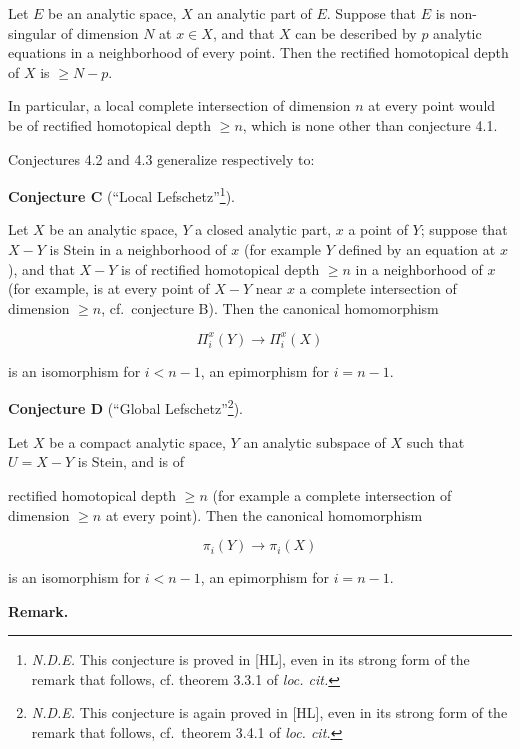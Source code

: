 \documentclass[
]{article}
\begin{document}
Let \(E\) be an analytic space, \(X\) an analytic part of \(E\). Suppose
that \(E\) is non-singular of dimension \(N\) at \(x \in X\), and that
\(X\) can be described by \(p\) analytic equations in a neighborhood of
every point. Then the rectified homotopical depth of \(X\) is
\(\geqslant N - p\).

In particular, a local complete intersection of dimension \(n\) at every
point would be of rectified homotopical depth \(\geqslant n\), which is
none other than conjecture 4.1.

Conjectures 4.2 and 4.3 generalize respectively to:

\textbf{Conjecture C} (``Local Lefschetz''\footnote{\emph{N.D.E.} This
  conjecture is proved in {[}HL{]}, even in its strong form of the
  remark that follows, cf. theorem 3.3.1 of \emph{loc. cit.}}).

Let \(X\) be an analytic space, \(Y\) a closed analytic part, \(x\) a
point of \(Y\); suppose that \(X - Y\) is Stein in a neighborhood of
\(x\) (for example \(Y\) defined by an equation at \(x\)), and that
\(X - Y\) is of rectified homotopical depth \(\geqslant n\) in a
neighborhood of \(x\) (for example, is at every point of \(X - Y\) near
\(x\) a complete intersection of dimension \(\geqslant n\),
cf.~conjecture B). Then the canonical homomorphism

\[
\Pi^{x}_{i}(Y) \to \Pi^{x}_{i}(X)
\]

is an isomorphism for \(i < n - 1\), an epimorphism for \(i = n - 1\).

\textbf{Conjecture D} (``Global Lefschetz''\footnote{\emph{N.D.E.} This
  conjecture is again proved in {[}HL{]}, even in its strong form of the
  remark that follows, cf.~theorem 3.4.1 of \emph{loc. cit.}}).

Let \(X\) be a compact analytic space, \(Y\) an analytic subspace of
\(X\) such that \(U = X - Y\) is Stein, and is of

rectified homotopical depth \(\geqslant n\) (for example a complete
intersection of dimension \(\geqslant n\) at every point). Then the
canonical homomorphism

\[
\pi_{i}(Y) \to \pi_{i}(X)
\]

is an isomorphism for \(i < n - 1\), an epimorphism for \(i = n - 1\).

\textbf{Remark.}
\end{document}
